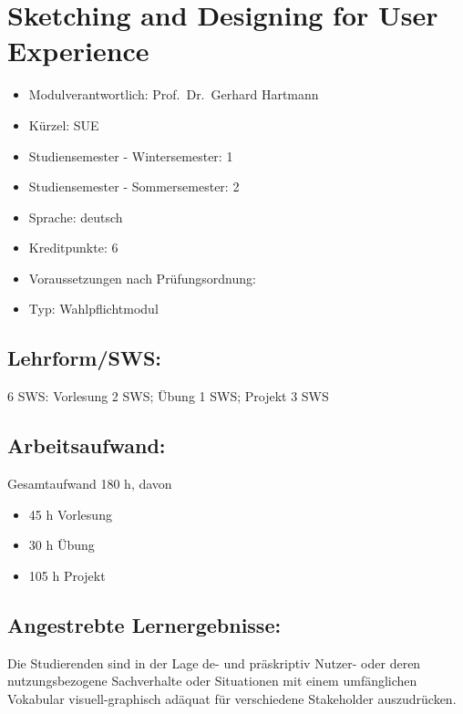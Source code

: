 \chapter{Sketching and Designing for User
Experience}\label{sketching-and-designing-for-user-experience}

\begin{itemize}
\tightlist
\item
  Modulverantwortlich: Prof.~Dr.~Gerhard Hartmann
\item
  Kürzel: SUE
\item
  Studiensemester - Wintersemester: 1
\item
  Studiensemester - Sommersemester: 2
\item
  Sprache: deutsch
\item
  Kreditpunkte: 6
\item
  Voraussetzungen nach Prüfungsordnung:
\item
  Typ: Wahlpflichtmodul
\end{itemize}

\section*{Lehrform/SWS:}\label{lehrformsws-7}

6 SWS: Vorlesung 2 SWS; Übung 1 SWS; Projekt 3 SWS

\section*{Arbeitsaufwand:}\label{arbeitsaufwand-13}

Gesamtaufwand 180 h, davon

\begin{itemize}
\tightlist
\item
  45 h Vorlesung
\item
  30 h Übung
\item
  105 h Projekt
\end{itemize}

\section*{Angestrebte
Lernergebnisse:}\label{angestrebte-lernergebnisse-7}

Die Studierenden sind in der Lage de- und präskriptiv Nutzer- oder deren
nutzungsbezogene Sachverhalte oder Situationen mit einem umfänglichen
Vokabular visuell-graphisch adäquat für verschiedene Stakeholder
auszudrücken.

